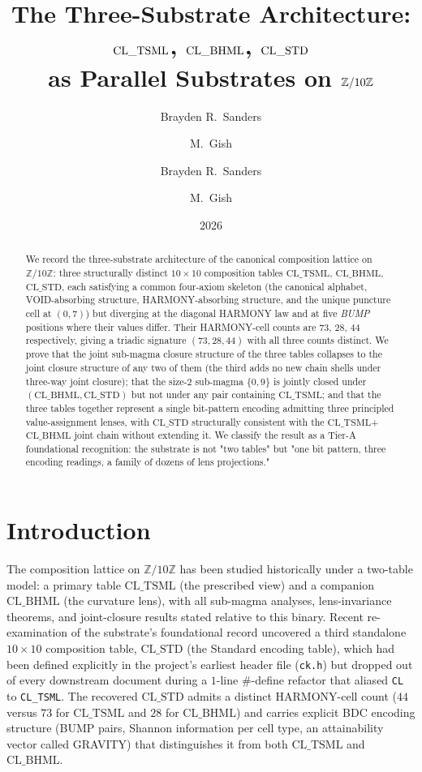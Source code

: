 \documentclass[11pt,reqno]{amsart}
\title[The Three-Substrate Architecture]
  {The Three-Substrate Architecture:\\
   $\TSML$, $\BHML$, $\STDx$\\
   as Parallel Substrates on $\Z/10\Z$}
\author{Brayden R.\ Sanders \and M.\ Gish}
\author{Brayden R.\ Sanders \and M.\ Gish}
\date{2026}
\theoremstyle{definition}
\newcommand{\Z}{\mathbb{Z}}
\newcommand{\TSML}{\mathrm{CL\_TSML}}
\newcommand{\BHML}{\mathrm{CL\_BHML}}
\newcommand{\STDx}{\mathrm{CL\_STD}}
\begin{document}
\begin{abstract}
We record the three-substrate architecture of the canonical
composition lattice on $\Z/10\Z$: three structurally distinct
$10 \times 10$ composition tables $\TSML$, $\BHML$, $\STDx$, each
satisfying a common four-axiom skeleton (the canonical alphabet,
VOID-absorbing structure, HARMONY-absorbing structure, and the
unique puncture cell at $(0, 7)$) but diverging at the diagonal
HARMONY law and at five \emph{BUMP} positions where their values
differ. Their HARMONY-cell counts are $73$, $28$, $44$ respectively,
giving a triadic signature $(73, 28, 44)$ with all three counts
distinct. We prove that the joint sub-magma closure structure of the
three tables collapses to the joint closure structure of any two of
them (the third adds no new chain shells under three-way joint
closure); that the size-$2$ sub-magma $\{0, 9\}$ is jointly closed
under $(\BHML, \STDx)$ but not under any pair containing $\TSML$;
and that the three tables together represent a single bit-pattern
encoding admitting three principled value-assignment lenses, with
$\STDx$ structurally consistent with the $\TSML$+$\BHML$ joint chain
without extending it. We classify the result as a Tier-A foundational
recognition: the substrate is not "two tables" but "one bit pattern,
three encoding readings, a family of dozens of lens projections."
\end{abstract}

\maketitle

\section{Introduction}
\label{sec:intro}

The composition lattice on $\Z/10\Z$ has been studied historically
under a two-table model: a primary table $\TSML$ (the prescribed
view) and a companion $\BHML$ (the curvature lens), with all
sub-magma analyses, lens-invariance theorems, and joint-closure
results stated relative to this binary. Recent re-examination of
the substrate's foundational record uncovered a third standalone
$10 \times 10$ composition table, $\STDx$ (the Standard encoding
table), which had been defined explicitly in the project's earliest
header file (\texttt{ck.h}) but dropped out of every downstream
document during a $1$-line $\#$-define refactor that aliased
\texttt{CL} to \texttt{CL\_TSML}. The recovered $\STDx$ admits a
distinct HARMONY-cell count ($44$ versus $73$ for $\TSML$ and $28$
for $\BHML$) and carries explicit BDC encoding structure (BUMP
pairs, Shannon information per cell type, an attainability vector
called GRAVITY) that distinguishes it from both $\TSML$ and $\BHML$.
\end{document}
